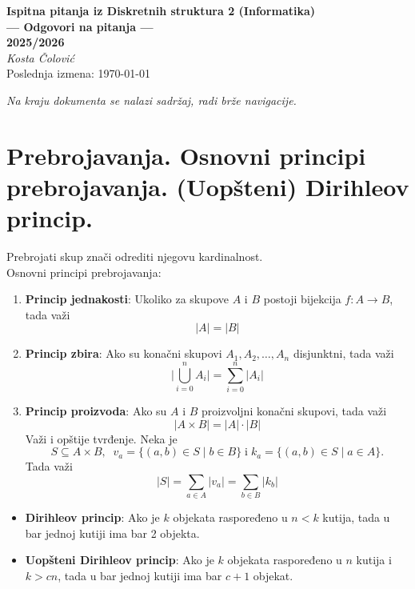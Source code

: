 \documentclass[a4paper,12pt]{article}
\numberwithin{algorithm}{section}
\theoremstyle{plain}
\theoremstyle{definition}
\theoremstyle{remark}
\begin{document}
\begin{center}
    \vspace*{5mm}
    {\large\bfseries Ispitna pitanja iz Diskretnih struktura 2 (Informatika)} \\
    \vspace{2mm}
    {\large\bfseries --- Odgovori na pitanja ---} \\
    \vspace{2mm}
    {\large\bfseries 2025/2026} \\
    \vspace{4mm}
    {\itshape Kosta Čolović} \\
    \vspace{2mm}
    {\small Poslednja izmena: \today}
\end{center}
\vspace{8mm}
\textit{Na kraju dokumenta se nalazi sadržaj, radi brže navigacije.}


\section{Prebrojavanja. Osnovni principi prebrojavanja. (Uopšteni) Dirihleov princip.}
Prebrojati skup znači odrediti njegovu kardinalnost.\\

\noindent Osnovni principi prebrojavanja:
\begin{enumerate}
    \item \textbf{Princip jednakosti}: Ukoliko za skupove $A$ i $B$ postoji bijekcija $f: A \to B$, tada važi \[|A| = |B|\]
    \item \textbf{Princip zbira}: Ako su konačni skupovi $A_1, A_2, \ldots, A_n$ disjunktni, tada važi \[\bigg|\bigcup_{i = 0}^n A_i \bigg| = \sum_{i = 0}^{n} | A_i |\]
    \item \textbf{Princip proizvoda}: Ako su $A$ i $B$ proizvoljni konačni skupovi, tada važi
    \[ |A \times B| = |A| \cdot |B| \]
    Važi i opštije tvrđenje. Neka je \[S \subseteq A \times B,\;\; v_a = \{(a, b) \in S \;|\; b \in B\}\; \text{i} \; k_a = \{(a, b) \in S \;|\; a \in A\}.\]
    Tada važi 
    \[ |S| = \sum_{a \in A} |v_a| = \sum_{b \in B} |k_b|\]
\end{enumerate}

\begin{itemize}
    \item \textbf{Dirihleov princip}: Ako je $k$ objekata raspoređeno u $n < k$ kutija, tada u bar jednoj kutiji ima bar 2 objekta.
    \item \textbf{Uopšteni Dirihleov princip}: Ako je $k$ objekata raspoređeno u $n$ kutija i $k > cn$, tada u bar jednoj kutiji ima bar $c + 1$ objekat.
\end{itemize}
\end{document}
